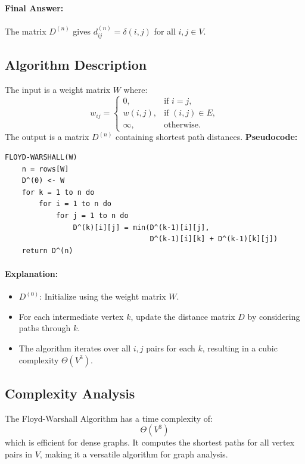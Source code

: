 \paragraph{Final Answer:}  
The matrix \( D^{(n)} \) gives \( d^{(n)}_{ij} = \delta(i, j) \) for all \( i, j \in V \).

\subsection{Algorithm Description}
The input is a weight matrix \( W \) where:
\[
w_{ij} = 
\begin{cases} 
0, & \text{if } i = j, \\
w(i, j), & \text{if } (i, j) \in E, \\
\infty, & \text{otherwise.}
\end{cases}
\]
The output is a matrix \( D^{(n)} \) containing shortest path distances. \newline
\textbf{Pseudocode:}
\begin{verbatim}
FLOYD-WARSHALL(W)
    n = rows[W]
    D^(0) <- W
    for k = 1 to n do
        for i = 1 to n do
            for j = 1 to n do
                D^(k)[i][j] = min(D^(k-1)[i][j], 
                                  D^(k-1)[i][k] + D^(k-1)[k][j])
    return D^(n)
\end{verbatim}

\paragraph{Explanation:}
\begin{itemize}
    \item \( D^{(0)} \): Initialize using the weight matrix \( W \).
    \item For each intermediate vertex \( k \), update the distance matrix \( D \) by considering paths through \( k \).
    \item The algorithm iterates over all \( i, j \) pairs for each \( k \), resulting in a cubic complexity \( \Theta(V^3) \).
\end{itemize}

\subsection{Complexity Analysis}
The Floyd-Warshall Algorithm has a time complexity of:
\[\Theta(V^3)\] which is efficient for dense graphs. It computes the shortest paths for all vertex pairs in \( V \), making it a versatile algorithm for graph analysis.

